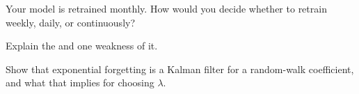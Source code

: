 \begin{interviewq}\label{iq:ml:online-learning-and-drift:4}
Your model is retrained monthly. How would you decide whether to retrain weekly, daily, or continuously?
\end{interviewq}

\begin{interviewq}\label{iq:ml:online-learning-and-drift:5}
Explain the  and one weakness of it.
\end{interviewq}

\begin{interviewq}\label{iq:ml:online-learning-and-drift:6}
Show that exponential forgetting is a Kalman filter for a random-walk coefficient, and what that implies for choosing
$\lambda$.
\end{interviewq}
